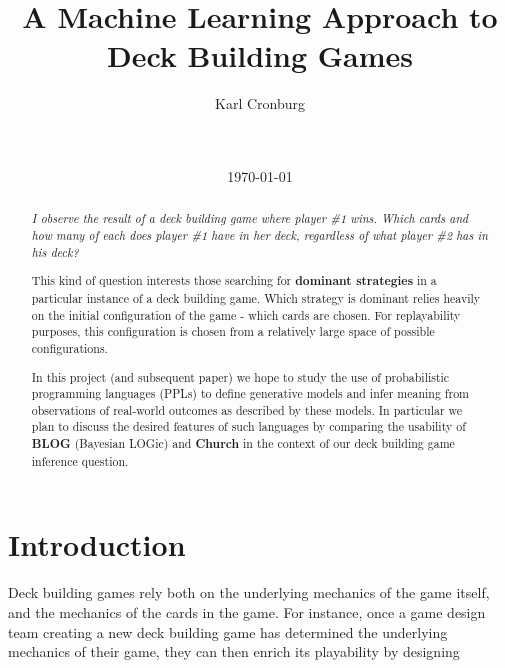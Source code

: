 \documentclass{acm_proc_article-sp}
\begin{document}
\title{A Machine Learning Approach to Deck Building Games}

\author{
  \alignauthor
  Karl Cronburg                   \\
   \\
         \\
}
\date{\today}

\maketitle

\begin{abstract}
\emph{I observe the result of a deck building game where player \#1 wins.
Which cards and how many of each does player \#1 have in her deck,
regardless of what player \#2 has in his deck?}

This kind of question interests those searching for {\bf dominant
strategies} in a particular instance of a deck building game.
Which strategy is dominant relies heavily on the initial configuration
of the game - which cards are chosen. For replayability purposes,
this configuration is chosen from a relatively large space of
possible configurations.

In this project (and subsequent paper) we hope to study the
use of probabilistic programming languages (PPLs) to define generative models
and infer meaning from observations of real-world outcomes as described
by these models. In particular we plan to discuss the desired features
of such languages by comparing the usability of {\bf BLOG} (Bayesian LOGic)
and {\bf Church} in the context of our deck building game inference question.


\end{abstract}

\section{Introduction}

Deck building games rely both on the underlying mechanics of the game itself,
and the mechanics of the cards in the game. For instance, once a game design team
creating a new deck building game has determined the underlying mechanics of
their game, they can then enrich its playability by designing 
\end{document}
